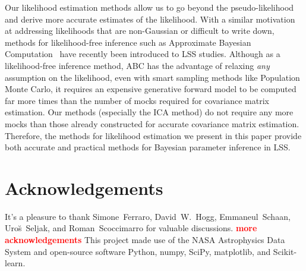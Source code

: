 \documentclass[12pt, letterpaper, preprint]{aastex}
\newcommand{\todo}[1]{{\bf \textcolor{red}{#1}}}
\begin{document}
Our likelihood estimation methods allow us to go beyond the pseudo-likelihood 
and derive more accurate estimates of the likelihood. With a similar 
motivation at addressing likelihoods that are non-Gaussian or difficult to 
write down, methods for likelihood-free inference such as Approximate Bayesian 
Computation~\citep[ABC;][]{hahn2017b,kacprzak2017,alsing2018} have recently 
been introduced to LSS studies. 
Although as a likelihood-free inference method, ABC has the advantage 
of relaxing \emph{any} assumption on the likelihood, even with smart sampling methods 
like Population Monte Carlo, it requires an expensive generative forward 
model to be computed far more times than the number of mocks required for 
covariance matrix estimation. Our methods (especially the ICA method)
do not require any more mocks than those already constructed for accurate covariance 
matrix estimation. Therefore, the methods for likelihood estimation we present
in this paper provide both accurate and practical methods for Bayesian 
parameter inference in LSS. 

\section*{Acknowledgements}
It's a pleasure to thank 
    Simone~Ferraro,
    David~W.~Hogg,
    Emmaneul~Schaan, 
    Uro{\u s}~Seljak,
    and Roman~Scoccimarro 
for valuable discussions.
\todo{more acknowledgements}
This project made use of the NASA Astrophysics Data System
and open-source software Python, numpy, SciPy, matplotlib, 
and Scikit-learn.



\end{document}
